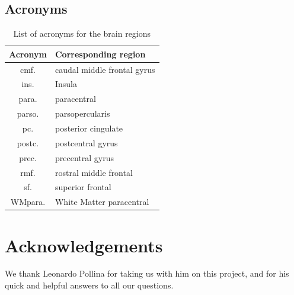 \documentclass[10pt,conference,compsocconf]{IEEEtran}
\begin{document}
\subsection{Acronyms}
\begin{table}[h!]
    \centering
    \begin{tabular}{| c | l |}
        \hline
        Acronym & Corresponding region \\
        \hline
        cmf. & caudal middle frontal gyrus \\
        ins. & Insula \\
        para. & paracentral \\
        parso. & parsopercularis \\
        pc. & posterior cingulate \\
        postc. & postcentral gyrus \\
        prec. & precentral gyrus \\
        rmf. & rostral middle frontal \\
        sf. & superior frontal \\
        WMpara. & White Matter paracentral \\
        \hline
    \end{tabular}
    \caption{List of acronyms for the brain regions}
    \label{tab:acronyms}
\end{table}



\section*{Acknowledgements}
We thank Leonardo Pollina for taking us with him on this project, and for his quick and helpful answers to all our questions.



\end{document}
